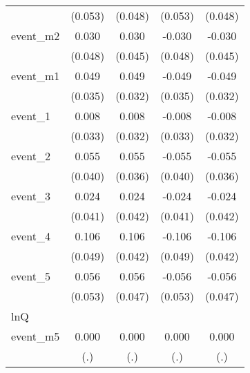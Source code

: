 {\begin{tabular}{l*{4}{c}}
            &     (0.053)         &     (0.048)         &     (0.053)         &     (0.048)         \\
[1em]
event\_m2    &       0.030         &       0.030         &      -0.030         &      -0.030         \\
            &     (0.048)         &     (0.045)         &     (0.048)         &     (0.045)         \\
[1em]
event\_m1    &       0.049         &       0.049         &      -0.049         &      -0.049         \\
            &     (0.035)         &     (0.032)         &     (0.035)         &     (0.032)         \\
[1em]
event\_1     &       0.008         &       0.008         &      -0.008         &      -0.008         \\
            &     (0.033)         &     (0.032)         &     (0.033)         &     (0.032)         \\
[1em]
event\_2     &       0.055         &       0.055         &      -0.055         &      -0.055         \\
            &     (0.040)         &     (0.036)         &     (0.040)         &     (0.036)         \\
[1em]
event\_3     &       0.024         &       0.024         &      -0.024         &      -0.024         \\
            &     (0.041)         &     (0.042)         &     (0.041)         &     (0.042)         \\
[1em]
event\_4     &       0.106\sym{*}  &       0.106\sym{*}  &      -0.106\sym{*}  &      -0.106\sym{*}  \\
            &     (0.049)         &     (0.042)         &     (0.049)         &     (0.042)         \\
[1em]
event\_5     &       0.056         &       0.056         &      -0.056         &      -0.056         \\
            &     (0.053)         &     (0.047)         &     (0.053)         &     (0.047)         \\
\hline
lnQ         &                     &                     &                     &                     \\
event\_m5    &       0.000         &       0.000         &       0.000         &       0.000         \\
            &         (.)         &         (.)         &         (.)         &         (.)         \\

\end{tabular}}
